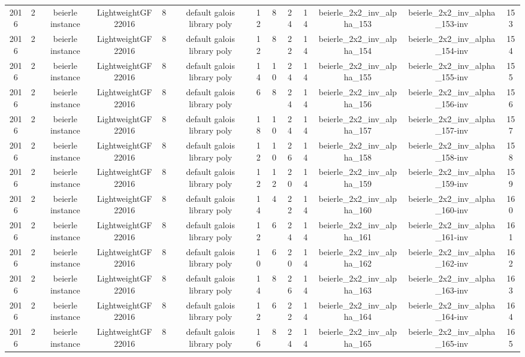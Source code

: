 \begin{tabular}{c c c c c c c c c c c c c}
2016 & 2 & beierle instance & LightweightGF22016 & 8 & default galois library poly & 12 & 8 & 24 & 14 & beierle_2x2_inv_alpha_153 & beierle_2x2_inv_alpha_153-inv & 153 \\
2016 & 2 & beierle instance & LightweightGF22016 & 8 & default galois library poly & 12 & 8 & 22 & 14 & beierle_2x2_inv_alpha_154 & beierle_2x2_inv_alpha_154-inv & 154 \\
2016 & 2 & beierle instance & LightweightGF22016 & 8 & default galois library poly & 14 & 10 & 24 & 14 & beierle_2x2_inv_alpha_155 & beierle_2x2_inv_alpha_155-inv & 155 \\
2016 & 2 & beierle instance & LightweightGF22016 & 8 & default galois library poly & 6 & 8 & 24 & 14 & beierle_2x2_inv_alpha_156 & beierle_2x2_inv_alpha_156-inv & 156 \\
2016 & 2 & beierle instance & LightweightGF22016 & 8 & default galois library poly & 18 & 10 & 24 & 14 & beierle_2x2_inv_alpha_157 & beierle_2x2_inv_alpha_157-inv & 157 \\
2016 & 2 & beierle instance & LightweightGF22016 & 8 & default galois library poly & 12 & 10 & 26 & 14 & beierle_2x2_inv_alpha_158 & beierle_2x2_inv_alpha_158-inv & 158 \\
2016 & 2 & beierle instance & LightweightGF22016 & 8 & default galois library poly & 12 & 12 & 20 & 14 & beierle_2x2_inv_alpha_159 & beierle_2x2_inv_alpha_159-inv & 159 \\
2016 & 2 & beierle instance & LightweightGF22016 & 8 & default galois library poly & 14 & 4 & 22 & 14 & beierle_2x2_inv_alpha_160 & beierle_2x2_inv_alpha_160-inv & 160 \\
2016 & 2 & beierle instance & LightweightGF22016 & 8 & default galois library poly & 12 & 6 & 24 & 14 & beierle_2x2_inv_alpha_161 & beierle_2x2_inv_alpha_161-inv & 161 \\
2016 & 2 & beierle instance & LightweightGF22016 & 8 & default galois library poly & 10 & 6 & 20 & 14 & beierle_2x2_inv_alpha_162 & beierle_2x2_inv_alpha_162-inv & 162 \\
2016 & 2 & beierle instance & LightweightGF22016 & 8 & default galois library poly & 14 & 8 & 26 & 14 & beierle_2x2_inv_alpha_163 & beierle_2x2_inv_alpha_163-inv & 163 \\
2016 & 2 & beierle instance & LightweightGF22016 & 8 & default galois library poly & 12 & 6 & 22 & 14 & beierle_2x2_inv_alpha_164 & beierle_2x2_inv_alpha_164-inv & 164 \\
2016 & 2 & beierle instance & LightweightGF22016 & 8 & default galois library poly & 16 & 8 & 24 & 14 & beierle_2x2_inv_alpha_165 & beierle_2x2_inv_alpha_165-inv & 165 \\

\end{tabular}
